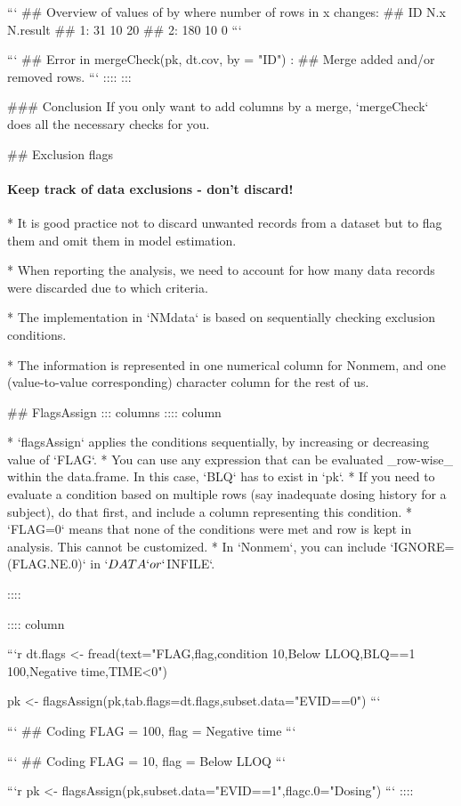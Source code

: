 ```
## Overview of values of by where number of rows in x changes:
##     ID N.x N.result
## 1:  31  10       20
## 2: 180  10        0
```

```
## Error in mergeCheck(pk, dt.cov, by = "ID") : 
##   Merge added and/or removed rows.
```
::::
\normalsize
:::

### Conclusion
If you only want to add columns by a merge, `mergeCheck` does all the necessary checks for you.

## Exclusion flags
\framesubtitle{Keep track of data exclusions - don't discard!}

* It is good practice not to discard unwanted records from a dataset but to flag
them and omit them in model estimation. 

* When reporting the analysis,
we need to account for how many data records were discarded due
to which criteria. 

* The implementation in `NMdata` is based on sequentially checking
exclusion conditions.

* The information is represented in one numerical column for
Nonmem, and one (value-to-value corresponding) character column for
the rest of us.

## FlagsAssign
::: columns
:::: column

* `flagsAssign` applies the conditions sequentially, by increasing or decreasing
value of `FLAG`. 
* You can use any expression that can be evaluated _row-wise_ within
the data.frame. In this case, `BLQ` has to exist in `pk`.
* If you need to evaluate a condition based on multiple rows (say inadequate dosing history for a subject), do that first, and include a column representing this condition.
* `FLAG=0` means that none of the conditions were met and row is kept in analysis. This cannot be customized.
* In `Nonmem`, you can include `IGNORE=(FLAG.NE.0)` in `$DATA` or `$INFILE`.

::::

:::: column
\footnotesize



```r
dt.flags <- fread(text="FLAG,flag,condition
10,Below LLOQ,BLQ==1
100,Negative time,TIME<0")

pk <- flagsAssign(pk,tab.flags=dt.flags,subset.data="EVID==0")
```

```
## Coding FLAG = 100, flag = Negative time
```

```
## Coding FLAG = 10, flag = Below LLOQ
```

```r
pk <- flagsAssign(pk,subset.data="EVID==1",flagc.0="Dosing")
```
::::

